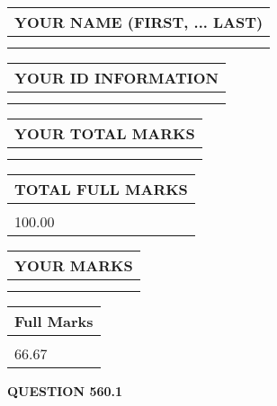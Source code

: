 \documentclass{ctexart}
\begin{document}
   
   
   
\newpage 
\setcounter{page}{ 
   560001 } 
   
   
   
   
\noindent\begin{tabular}{|l|}
\hline
YOUR NAME (FIRST, ... LAST)  \\
\hline
 \\ 
 \\ 
\hline
\end{tabular}
\hspace{0.05in} \begin{tabular}{|l|}
\hline
 YOUR   ID   INFORMATION  \\
\hline
 \\ 
 \\ 
\hline
\end{tabular}
   
   
\vspace{0.2in}\noindent\begin{tabular}{|l|}
\hline
YOUR TOTAL MARKS  \\
\hline
 \\ 
 \\ 
\hline
\end{tabular}
\hspace{0.05in} \begin{tabular}{|l|}
\hline
TOTAL FULL MARKS  \\
\hline
 \\ 
100.00 \\
\hline
\end{tabular}
   
   
 \vspace{0.2in}
 
 
 
 
   
   
  
\vspace{0.2in}
  
\noindent\begin{tabular}{|l|}
\hline
 YOUR MARKS  \\
\hline
 \\ 
 \\ 
\hline
\end{tabular}
\hspace{0.05in} \begin{tabular}{|l|}
\hline
 Full Marks  \\
\hline
 \\ 
66.67 \\
\hline
\end{tabular}
{\textbf{\Large{QUESTION
560.1 
}}}
  
\end{document}
